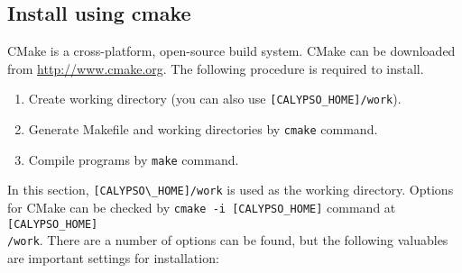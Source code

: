 %

\subsection{Install using cmake}
CMake is a cross-platform, open-source build system. CMake can be downloaded from \url{http://www.cmake.org}. The following procedure is required to install.
%
\begin{enumerate}
\item Create working directory (you can also use \verb|[CALYPSO_HOME]/work|).
\item Generate Makefile and working directories by {\tt cmake} command.
\item Compile programs by {\tt make} command.
\end{enumerate}
%
In this section, \verb|[CALYPSO\_HOME]/work| is used as the working directory.
Options for CMake can be checked by \verb|cmake -i [CALYPSO_HOME]| command at \verb|[CALYPSO_HOME]| \\
\verb|/work|. There are a number of options can be found, but the following valuables are important settings for installation:
%
